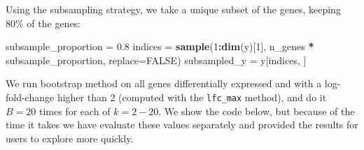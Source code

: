 \documentclass[9pt,a4paper,]{extarticle}
\newenvironment{Shaded}{\begin{snugshade}}{\end{snugshade}}
\newcommand{\DataTypeTok}[1]{\textcolor[rgb]{0.13,0.29,0.53}{#1}}
\newcommand{\DecValTok}[1]{\textcolor[rgb]{0.00,0.00,0.81}{#1}}
\newcommand{\FloatTok}[1]{\textcolor[rgb]{0.00,0.00,0.81}{#1}}
\newcommand{\KeywordTok}[1]{\textcolor[rgb]{0.13,0.29,0.53}{\textbf{#1}}}
\newcommand{\NormalTok}[1]{#1}
\newcommand{\OperatorTok}[1]{\textcolor[rgb]{0.81,0.36,0.00}{\textbf{#1}}}
\newcommand{\OtherTok}[1]{\textcolor[rgb]{0.56,0.35,0.01}{#1}}
\newcommand{\StringTok}[1]{\textcolor[rgb]{0.31,0.60,0.02}{#1}}
\begin{document}
Using the subsampling strategy, we take a unique subset of the genes, keeping 80\% of the genes:

\begin{Shaded}
\begin{Highlighting}[]
\NormalTok{subsample_proportion =}\StringTok{ }\FloatTok{0.8}
\NormalTok{indices =}\StringTok{ }\KeywordTok{sample}\NormalTok{(}\DecValTok{1}\OperatorTok{:}\KeywordTok{dim}\NormalTok{(y)[}\DecValTok{1}\NormalTok{], n_genes }\OperatorTok{*}\StringTok{ }\NormalTok{subsample_proportion, }\DataTypeTok{replace=}\OtherTok{FALSE}\NormalTok{)}
\NormalTok{subsampled_y =}\StringTok{ }\NormalTok{y[indices, ]}
\end{Highlighting}
\end{Shaded}

We run bootstrap method on all genes differentially expressed and with a
log-fold-change higher than 2 (computed with the \texttt{lfc\_max} method), and do it
\(B=20\) times for each of \(k=2-20\). We show the code below, but because of the
time it takes we have evaluate these values separately and provided the
results for users to explore more quickly.
\end{document}
